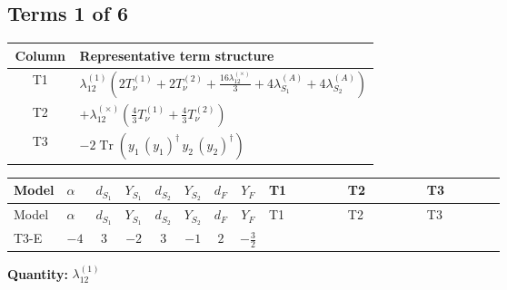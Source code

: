 \documentclass[8pt]{article}
\begin{document}
\begin{landscape}
\subsection*{Terms 1 of 6}
\begin{center}
\begin{tabular}{@{}c >{\raggedright\arraybackslash}p{0.82\linewidth}@{}}
\toprule
Column & Representative term structure \\
\midrule
T1 & \(\displaystyle {\lambda_{12}^{(1)}} \left(2 T_{\nu}^{(1)}+2 T_{\nu}^{(2)}+\frac{16 {\lambda_{12}^{(\times)}}}{3}+4 {\lambda_{S_1}^{(A)}}+4 {\lambda_{S_2}^{(A)}}\right)\) \\
\midrule
T2 & \(\displaystyle +{\lambda_{12}^{(\times)}} \left(\frac{4}{3} T_{\nu}^{(1)}+\frac{4}{3} T_{\nu}^{(2)}\right)\) \\
\midrule
T3 & \(\displaystyle -2 \operatorname{Tr}\!\left({y_1}\,\left({y_1}\right)^{\dagger}\,{y_2}\,\left({y_2}\right)^{\dagger}\right)\) \\
\midrule
\bottomrule
\end{tabular}
\end{center}
\smallskip
\tiny
\begin{longtable}{@{}llcccccc >{\raggedright\arraybackslash}p{0.21\linewidth} >{\raggedright\arraybackslash}p{0.21\linewidth} >{\raggedright\arraybackslash}p{0.21\linewidth}@{}}
\toprule
Model & $\alpha$ & $d_{S_1}$ & $Y_{S_1}$ & $d_{S_2}$ & $Y_{S_2}$ & $d_F$ & $Y_F$ & T1 & T2 & T3 \\
\midrule
\endfirsthead
\toprule
Model & $\alpha$ & $d_{S_1}$ & $Y_{S_1}$ & $d_{S_2}$ & $Y_{S_2}$ & $d_F$ & $Y_F$ & T1 & T2 & T3 \\
\midrule
\endhead
T3-E & $-4$ & $3$ & $-2$ & $3$ & $-1$ & $2$ & $-\frac{3}{2}$ & \scriptsize\adjustbox{max width=\linewidth}{$\begin{gathered} {\lambda_{12}^{(1)}} \left(2 T_{\nu}^{(1)}+2 T_{\nu}^{(2)}+\frac{16 {\lambda_{12}^{(\times)}}}{3}+4 {\lambda_{S_1}^{(A)}}+4 {\lambda_{S_2}^{(A)}}\right)\end{gathered}$} & \scriptsize\adjustbox{max width=\linewidth}{$\begin{gathered} +{\lambda_{12}^{(\times)}} \left(\frac{4}{3} T_{\nu}^{(1)}+\frac{4}{3} T_{\nu}^{(2)}\right)\end{gathered}$} & \scriptsize\adjustbox{max width=\linewidth}{$\begin{gathered} -2 \operatorname{Tr}\!\left({y_1}\,\left({y_1}\right)^{\dagger}\,{y_2}\,\left({y_2}\right)^{\dagger}\right)\end{gathered}$} \\
\midrule
\bottomrule
\end{longtable}
\clearpage
\noindent\textbf{Quantity: }$\lambda_{12}^{(1)}$\par\smallskip

\end{landscape}
\end{document}
